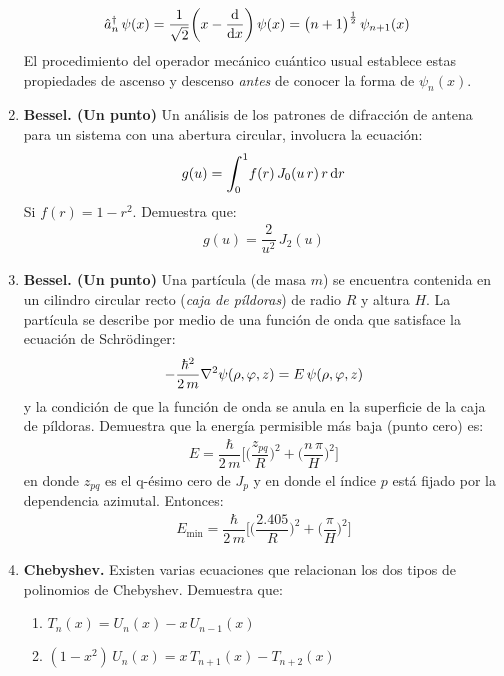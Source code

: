 \begin{enumerate}
\begin{align*}
\hat{a}_{n}^{\dagger} \, \psi (x) &= \dfrac{1}{\sqrt{2}} \bigg( x - \dv{x} \bigg) \, \psi (x) = \big( n + 1 \big)^{\frac{1}{2}} \, \psi_{n+1} (x)
\end{align*}
El procedimiento del operador mecánico cuántico usual establece estas propiedades de ascenso y descenso \emph{antes} de conocer la forma de $\psi_{n}(x)$.
\item \textbf{Bessel. (Un punto) } Un análisis de los patrones de difracción de antena para un sistema con una abertura circular, involucra la ecuación:
\begin{align*}
g(u) = \scaleint{6ex}_{\bs 0}^{1} f(r) \, J_{0}(u \, r) \, r \dd{r}
\end{align*}
Si $f(r) = 1 - r^{2}$. Demuestra que:
\begin{align*}
g(u) = \dfrac{2}{u^{2}} \, J_{2} (u)
\end{align*}
\item \textbf{Bessel. (Un punto) } Una partícula (de masa $m$) se encuentra contenida en un cilindro circular recto (\emph{caja de píldoras}) de radio $R$ y altura $H$. La partícula se describe por medio de una función de onda que satisface la ecuación de Schrödinger:
\begin{align*}
- \dfrac{\hbar^{2}}{2 \, m} \laplacian \psi (\rho, \varphi, z) = E \, \psi (\rho, \varphi, z)
\end{align*}
y la condición de que la función de onda se anula en la superficie de la caja de píldoras. Demuestra que la energía permisible más baja (punto cero) es:
\begin{align*}
E = \dfrac{\hbar}{2 \, m} \bigg[ \bigg( \dfrac{z_{pq}}{R} \bigg)^{2} + \bigg( \dfrac{n \, \pi}{H} \bigg)^{2} \bigg] 
\end{align*}
en donde $z_{pq}$ es el q-ésimo cero de $J_{p}$ y en donde el índice $p$ está fijado por la dependencia azimutal. Entonces:
\begin{align*}
E_{\min} = \dfrac{\hbar}{2 \, m} \bigg[ \bigg( \dfrac{2.405}{R} \bigg)^{2} + \bigg( \dfrac{\pi}{H} \bigg)^{2} \bigg] 
\end{align*}
\item \textbf{Chebyshev. } Existen varias ecuaciones que relacionan los dos tipos de polinomios de Chebyshev. Demuestra que:
\begin{enumerate}
\item $T_{n}(x) = U_{n}(x) - x \, U_{n-1}(x)$
\item $(1 - x^{2}) \, U_{n}(x) = x \, T_{n+1}(x) - T_{n+2}(x)$

\end{enumerate}
\end{enumerate}
